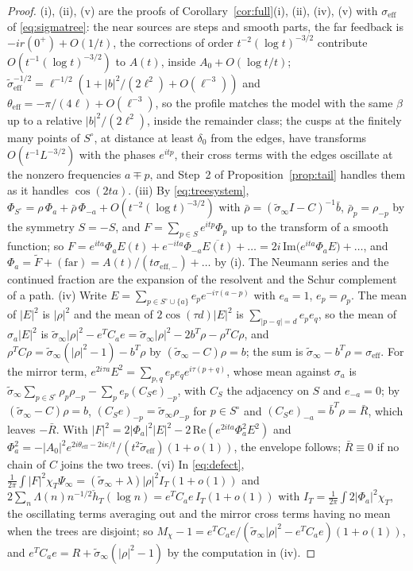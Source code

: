 \documentclass[11pt]{article}
\theoremstyle{definition}
\theoremstyle{remark}
\begin{document}
\begin{proof}
(i), (ii), (v) are the proofs of Corollary~\ref{cor:full}(i), (ii), (iv), (v) with $\sigma_{\mathrm{eff}}$ of \eqref{eq:sigmatree}: the near sources are steps and smooth parts, the far feedback is $-ir(0^+)+O(1/t)$, the corrections of order $t^{-2}(\log t)^{-3/2}$ contribute $O(t^{-1}(\log t)^{-3/2})$ to $A(t)$, inside $A_0+O(\log t/t)$; $\tilde\sigma_{\mathrm{eff}}^{-1/2}=\ell^{-1/2}(1+|b|^2/(2\ell^2)+O(\ell^{-3}))$ and $\theta_{\mathrm{eff}}=-\pi/(4\ell)+O(\ell^{-3})$, so the profile matches the model with the same $\beta$ up to a relative $|b|^2/(2\ell^2)$, inside the remainder class; the cusps at the finitely many points of $S^\circ$, at distance at least $\delta_0$ from the edges, have transforms $O(t^{-1}L^{-3/2})$ with the phases $e^{itp}$, their cross terms with the edges oscillate at the nonzero frequencies $a\mp p$, and Step~2 of Proposition~\ref{prop:tail} handles them as it handles $\cos(2ta)$. (iii) By \eqref{eq:treesystem}, $\Phi_{S^\circ}=\rho\,\Phi_a+\bar\rho\,\Phi_{-a}+O(t^{-2}(\log t)^{-3/2})$ with $\bar\rho=(\tilde\sigma_\infty I-C)^{-1}\bar b$, $\bar\rho_p=\rho_{-p}$ by the symmetry $S=-S$, and $F=\sum_{p\in S}e^{itp}\Phi_p$ up to the transform of a smooth function; so $F=e^{ita}\Phi_aE(t)+e^{-ita}\Phi_{-a}\overline{E(t)}+\dots=2i\,\mathrm{Im}\big(e^{ita}\Phi_aE\big)+\dots$, and $\Phi_a=\tilde F+(\text{far})=A(t)/(t\sigma_{\mathrm{eff},-})+\dots$ by (i). The Neumann series and the continued fraction are the expansion of the resolvent and the Schur complement of a path. (iv) Write $E=\sum_{p\in S^\circ\cup\{a\}}e_pe^{-i\tau(a-p)}$ with $e_a=1$, $e_p=\rho_p$. The mean of $|E|^2$ is $|\rho|^2$ and the mean of $2\cos(\tau d)|E|^2$ is $\sum_{|p-q|=d}e_pe_q$, so the mean of $\sigma_a|E|^2$ is $\tilde\sigma_\infty|\rho|^2-e^TC_ae=\tilde\sigma_\infty|\rho|^2-2b^T\rho-\rho^TC\rho$, and $\rho^TC\rho=\tilde\sigma_\infty(|\rho|^2-1)-b^T\rho$ by $(\tilde\sigma_\infty-C)\rho=b$; the sum is $\tilde\sigma_\infty-b^T\rho=\sigma_{\mathrm{eff}}$. For the mirror term, $e^{2i\tau a}E^2=\sum_{p,q}e_pe_qe^{i\tau(p+q)}$, whose mean against $\sigma_a$ is $\tilde\sigma_\infty\sum_{p\in S^\circ}\rho_p\rho_{-p}-\sum_pe_p(C_Se)_{-p}$, with $C_S$ the adjacency on $S$ and $e_{-a}=0$; by $(\tilde\sigma_\infty-C)\rho=b$, $(C_Se)_{-p}=\tilde\sigma_\infty\rho_{-p}$ for $p\in S^\circ$ and $(C_Se)_{-a}=\bar b^T\rho=\bar R$, which leaves $-\bar R$. With $|F|^2=2|\Phi_a|^2|E|^2-2\,\mathrm{Re}(e^{2ita}\Phi_a^2E^2)$ and $\Phi_a^2=-|A_0|^2e^{2i\theta_{\mathrm{eff}}-2i\kappa/t}/(t^2\tilde\sigma_{\mathrm{eff}})(1+o(1))$, the envelope follows; $\bar R\equiv0$ if no chain of $C$ joins the two trees. (vi) In \eqref{eq:defect}, $\frac1{2\pi}\int|F|^2\chi_T\Psi_\infty=(\tilde\sigma_\infty+\lambda)|\rho|^2I_T(1+o(1))$ and $2\sum_n\Lambda(n)n^{-1/2}\check h_T(\log n)=e^TC_ae\,I_T(1+o(1))$ with $I_T=\frac1{2\pi}\int2|\Phi_a|^2\chi_T$, the oscillating terms averaging out and the mirror cross terms having no mean when the trees are disjoint; so $M_\chi-1=e^TC_ae/(\tilde\sigma_\infty|\rho|^2-e^TC_ae)(1+o(1))$, and $e^TC_ae=R+\tilde\sigma_\infty(|\rho|^2-1)$ by the computation in (iv).
\end{proof}
\end{document}
